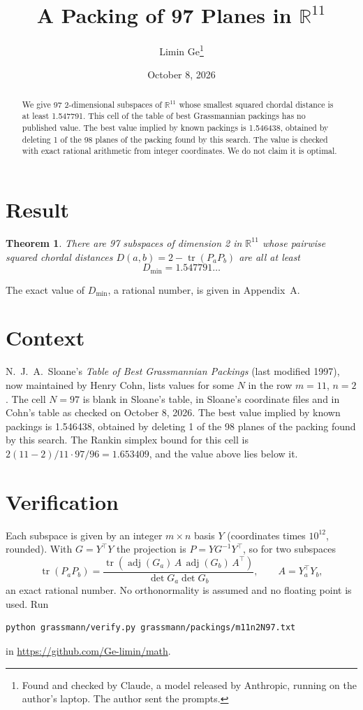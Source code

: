 \documentclass[11pt,a4paper]{article}
\title{A Packing of 97 Planes in $\mathbb{R}^{11}$}
\author{Limin Ge\thanks{Found and checked by Claude, a model released by Anthropic, running on the author's laptop. The author sent the prompts.}}
\date{October 8, 2026}
\newtheorem*{theorem}{Theorem}
\begin{document}
\maketitle
\begin{abstract}
We give 97 2-dimensional subspaces of $\mathbb{R}^{11}$ whose smallest squared chordal distance is at least 1.547791. This cell of the table of best Grassmannian packings has no published value. The best value implied by known packings is 1.546438, obtained by deleting 1 of the 98 planes of the packing found by this search. The value is checked with exact rational arithmetic from integer coordinates. We do not claim it is optimal.
\end{abstract}

\section{Result}
\begin{theorem}
There are 97 subspaces of dimension 2 in $\mathbb{R}^{11}$ whose pairwise squared chordal distances $D(a,b) = 2 - \operatorname{tr}(P_aP_b)$ are all at least
\[ D_{\min} = 1.547791\ldots \]
\end{theorem}
The exact value of $D_{\min}$, a rational number, is given in Appendix~A.


\section{Context}
N.~J.~A.~Sloane's \emph{Table of Best Grassmannian Packings} (last modified 1997), now maintained by Henry Cohn, lists values for some $N$ in the row $m=11$, $n=2$. The cell $N=97$ is blank in Sloane's table, in Sloane's coordinate files and in Cohn's table as checked on October 8, 2026. The best value implied by known packings is 1.546438, obtained by deleting 1 of the 98 planes of the packing found by this search. The Rankin simplex bound for this cell is $2(11-2)/11\cdot 97/96 = 1.653409$, and the value above lies below it.


\section{Verification}
Each subspace is given by an integer $m\times n$ basis $Y$ (coordinates times $10^{12}$, rounded). With $G=Y^\top Y$ the projection is $P=YG^{-1}Y^\top$, so for two subspaces
\[ \operatorname{tr}(P_aP_b)=\frac{\operatorname{tr}(\operatorname{adj}(G_a)\,A\,\operatorname{adj}(G_b)\,A^\top)}{\det G_a\det G_b},\qquad A=Y_a^\top Y_b, \]
an exact rational number. No orthonormality is assumed and no floating point is used. Run
\begin{verbatim}
python grassmann/verify.py grassmann/packings/m11n2N97.txt
\end{verbatim}
in \url{https://github.com/Ge-limin/math}.
\end{document}
